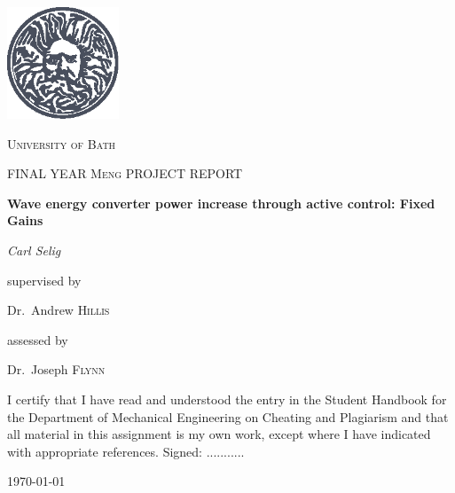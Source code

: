 \documentclass{report}
\begin{document}
\begin{titlepage}
	\centering
	\includegraphics[width=0.25\textwidth]{graphics/logo}\par\vspace{1cm}
	{\scshape\LARGE University of Bath \par}
	\vspace{1cm}
	{\scshape\Large FINAL YEAR Meng PROJECT REPORT\par}
	\vspace{1cm}
	{\huge\bfseries Wave energy converter power increase through active control: Fixed Gains\par}
	\vspace{2cm}
	{\Large\itshape Carl Selig\par}

	\vfill
	
	supervised by\par
	Dr.~Andrew \textsc{Hillis}\par
	assessed by\par
	Dr.~Joseph \textsc{Flynn}

	\vfill
	
\tiny{I certify that I have read and understood the entry in the Student Handbook for the
Department of Mechanical Engineering on Cheating and Plagiarism and that all
material in this assignment is my own work, except where I have indicated with
appropriate references. Signed: ...........}

	{\large \today\par}
\end{titlepage}
\end{document}
